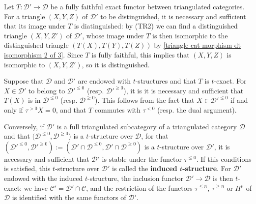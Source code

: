 \begin{example}\label{triangle cat t-structure subcategory eg}
Let $T:\mathcal{D}'\to\mathcal{D}$ be a fully faithful exact functor between triangulated categories. For a triangle $(X,Y,Z)$ of $\mathcal{D}'$ to be distinguished, it is necessary and sufficient that its image under $T$ is diatinguished: by (TR2) we can find a distinguished triangle $(X,Y,Z')$ of $\mathcal{D}'$, whose image under $T$ is then isomorphic to the distinguished triangle $(T(X),T(Y),T(Z))$ by \cref{triangle cat morphism dt isomorphism 2 of 3}. Since $T$ is fully faithful, this implies that $(X,Y,Z)$ is isomorphic to $(X,Y,Z')$, so it is distinguished.\par
Suppose that $\mathcal{D}$ and $\mathcal{D}'$ are endowed with $t$-structures and that $T$ is $t$-exact. For $X\in\mathcal{D}'$ to belong to $\mathcal{D}'^{\leq 0}$ (resp. $\mathcal{D}'^{\geq 0}$), it is it is necessary and sufficient that $T(X)$ is in $\mathcal{D}^{\leq 0}$ (resp. $\mathcal{D}^{\geq 0}$). This follows from the fact that $X\in\mathcal{D}'^{\leq 0}$ if and only if $\tau^{>0}X=0$, and that $T$ commutes with $\tau^{<0}$ (resp. the dual argument).\par
Conversely, if $\mathcal{D}'$ is a full triangulated subcategory of a triangulated category $\mathcal{D}$ and that $(\mathcal{D}^{\leq 0},\mathcal{D}^{\geq 0}$) is a $t$-structure over $\mathcal{D}$, for that $(\mathcal{D}'^{\leq 0},\mathcal{D}'^{\geq 0}):=(\mathcal{D}'\cap\mathcal{D}^{\leq 0},\mathcal{D}'\cap\mathcal{D}^{\geq 0})$ is a $t$-structure over $\mathcal{D}'$, it is necessary and sufficient that $\mathcal{D}'$ is stable under the functor $\tau^{\leq 0}$. If this conditions is satisfied, this $t$-structure over $\mathcal{D}'$ is called the \textbf{induced $t$-structure}. For $\mathcal{D}'$ endowed with the induced $t$-structure, the inclusion functor $\mathcal{D}'\to\mathcal{D}$ is then $t$-exact: we have $\mathcal{C}'=\mathcal{D}'\cap\mathcal{C}$, and the restriction of the functors $\tau^{\leq n}$, $\tau^{\geq n}$ or $H^p$ of $\mathcal{D}$ is identified with the same functors of $\mathcal{D}'$.
\end{example}

